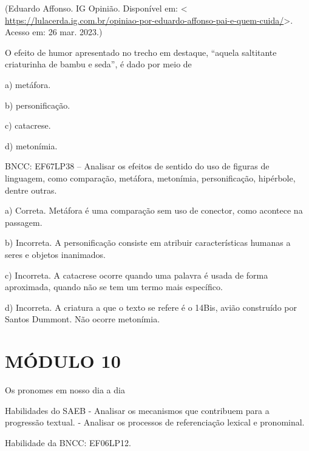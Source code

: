 (Eduardo Affonso. IG Opinião. Disponível em: \textless{}
\url{https://lulacerda.ig.com.br/opiniao-por-eduardo-affonso-pai-e-quem-cuida/}\textgreater.
Acesso em: 26 mar. 2023.)

O efeito de humor apresentado no trecho em destaque, ``aquela saltitante
criaturinha de bambu e seda'', é dado por meio de

a) metáfora.

b) personificação.

c) catacrese.

d) metonímia.

BNCC: EF67LP38 -- Analisar os efeitos de sentido do uso de figuras de
linguagem, como comparação, metáfora, metonímia, personificação,
hipérbole, dentre outras.

a) Correta. Metáfora é uma comparação sem uso de conector, como acontece
na passagem.

b) Incorreta. A personificação consiste em atribuir características
humanas a seres e objetos inanimados.

c) Incorreta. A catacrese ocorre quando uma palavra é usada de forma
aproximada, quando não se tem um termo mais específico.

d) Incorreta. A criatura a que o texto se refere é o 14Bis, avião
construído por Santos Dummont. Não ocorre metonímia.

\hypertarget{muxf3dulo-10}{%
\section{MÓDULO 10}\label{muxf3dulo-10}}

Os pronomes em nosso dia a dia

Habilidades do SAEB - Analisar os mecanismos que contribuem para a
progressão textual. - Analisar os processos de referenciação lexical e
pronominal.

Habilidade da BNCC: EF06LP12.


